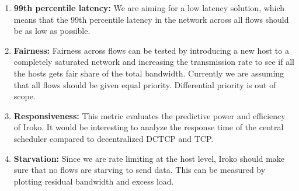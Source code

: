 \begin{enumerate}

\item \textbf{99th percentile latency:} We are aiming for a low latency solution,
which means that the 99th percentile latency in the network across all flows should
be as low as possible.

\item \textbf{Fairness:} Fairness across flows can be tested by introducing a
new host to a completely saturated network and increasing the transmission rate
to see if all the hosts gets fair share of the total bandwidth. Currently we are
assuming that all flows should be given equal priority. Differential priority is out of
scope.

\item \textbf{Responsiveness:} This metric evaluates the predictive power and
efficiency of Iroko. It would be interesting to analyze the response time of the
central scheduler compared to decentralized DCTCP and TCP.

\item \textbf{Starvation:} Since we are rate limiting at the host level, Iroko
should make sure that no flows are starving to send data. This can be measured
by plotting residual bandwidth and excess load.

\end{enumerate}
